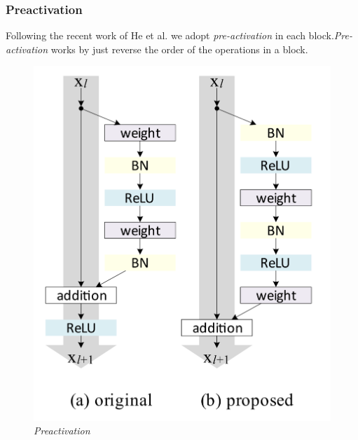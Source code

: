 \documentclass[../document.tex]{subfiles}
\begin{document}
\subsubsection{Preactivation}
Following the recent work of He et al. \cite{he2015identity} we adopt \emph{pre-activation} in each block.\emph{Pre-activation} works by just reverse the order of the operations in a block.

\begin{figure}[H]
    \centering
    \includegraphics[scale=0.2]{../img/implementation/estimator/preactivation.png}
    \caption{\emph{Preactivation} \cite{he2015identity}}
\end{figure}
\end{document}
